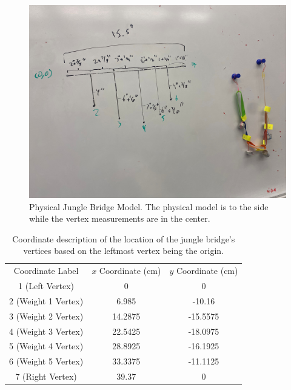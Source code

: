 \documentclass[10pt,letterpaper,onecolumn,report]{tau-class/tau}
\begin{document}
        \begin{figure}[H]
            \centering
            \setcounter{figure}{2} %
            \includegraphics[width=0.5\linewidth]{figures/figure 3; jungle bridge.jpg}
            \caption{Physical Jungle Bridge Model. The physical model is to the side while the vertex measurements are in the center.}
            \label{fig:enter-label}
        \end{figure}
        
        \begin{table}[H]
            \centering
            \setcounter{table}{2} %
            \begin{tabular}{ccc}
                 Coordinate Label
                &  \(x\) Coordinate (cm)
                & \(y\) Coordinate (cm)
                \\
                                 1 (Left Vertex)
                &  0
                & 0
                \\
                                 2 (Weight 1 Vertex)
                &  6.985
                & -10.16
                \\
                                 3 (Weight 2 Vertex)
                &  14.2875
                & -15.5575
                \\
                                 4 (Weight 3 Vertex)
                &  22.5425
                & -18.0975
                \\
                                 5 (Weight 4 Vertex)
                &  28.8925
                & -16.1925
                \\
                                 6 (Weight 5 Vertex)
                &  33.3375
                & -11.1125
                \\
                                 7 (Right Vertex)
                &  39.37
                & 0
                \\
            \end{tabular}
            \caption{Coordinate description of the location of the jungle bridge’s vertices based on the leftmost vertex being the origin.}
            \label{tab:my_label}
        \end{table}
    
\end{document}
